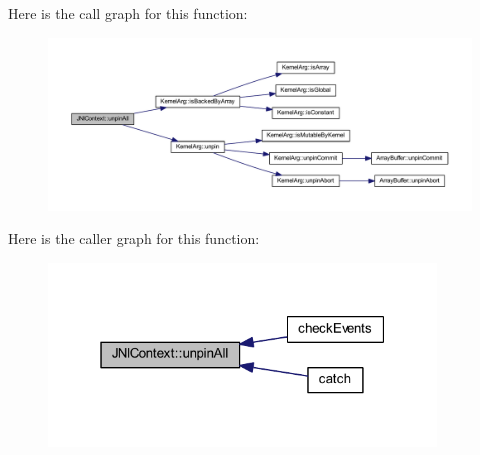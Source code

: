 Here is the call graph for this function\-:
\nopagebreak
\begin{figure}[H]
\begin{center}
\leavevmode
\includegraphics[width=350pt]{class_j_n_i_context_a06ec119ce96e3c59c52159976203cbee_cgraph}
\end{center}
\end{figure}




Here is the caller graph for this function\-:
\nopagebreak
\begin{figure}[H]
\begin{center}
\leavevmode
\includegraphics[width=292pt]{class_j_n_i_context_a06ec119ce96e3c59c52159976203cbee_icgraph}
\end{center}
\end{figure}




